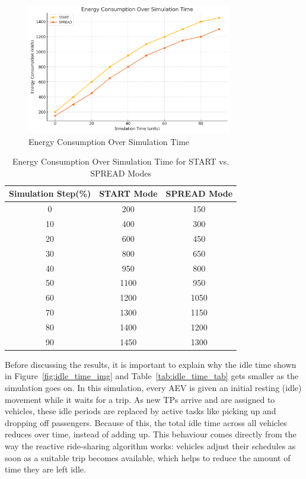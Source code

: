 \begin{figure}[h!]
    \centering
    \includegraphics[width=0.8\textwidth]{Crest/Images/energy_consumption.png}
    \caption{Energy Consumption Over Simulation Time}
    \label{fig:energy_consumption}
\end{figure}

\begin{table}[h!]
\centering
\begin{tabular}{|c|c|c|}
\hline
\textbf{Simulation Step(\%)} & \textbf{START Mode} & \textbf{SPREAD Mode} \\ \hline
0  & 200  & 150  \\ 
10 & 400  & 300  \\ 
20 & 600  & 450  \\ 
30 & 800  & 650  \\ 
40 & 950  & 800  \\ 
50 & 1100 & 950  \\ 
60 & 1200 & 1050 \\ 
70 & 1300 & 1150 \\ 
80 & 1400 & 1200 \\ 
90 & 1450 & 1300 \\ \hline
\end{tabular}
\caption{Energy Consumption Over Simulation Time for START vs. SPREAD Modes}
\label{tab:energy_consumption}
\end{table}

Before discussing the results, it is important to explain why the idle time shown in Figure~\ref{fig:idle_time_img} and Table~\ref{tab:idle_time_tab} gets smaller as the simulation goes on.  
In this simulation, every AEV is given an initial resting (idle) movement while it waits for a trip. As new TPs arrive and are assigned to vehicles, these idle periods are replaced by active tasks like picking up and dropping off passengers. Because of this, the total idle time across all vehicles reduces over time, instead of adding up.  
This behaviour comes directly from the way the reactive ride-sharing algorithm works: vehicles adjust their schedules as soon as a suitable trip becomes available, which helps to reduce the amount of time they are left idle.

